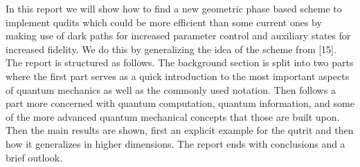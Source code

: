In this report we will show how to find a new geometric phase based scheme to implement qudits which could be more efficient than some current ones by making use of dark paths for increased parameter control and auxiliary states for increased fidelity. We do this by generalizing the idea of the scheme from [15]. The report is structured as follows. The background section is split into two parts where the first part serves as a quick introduction to the most important aspects of quantum mechanics as well as the commonly used notation. Then follows a part more concerned with quantum computation, quantum information, and some of the more advanced quantum mechanical concepts that those are built upon. Then the main results are shown, first an explicit example for the qutrit and then how it generalizes in higher dimensions. The report ends with conclusions and a brief outlook.


